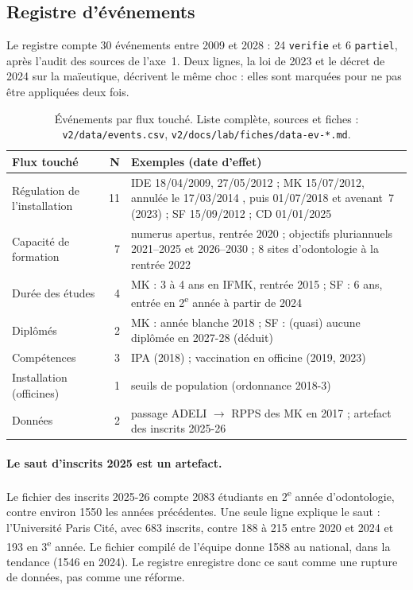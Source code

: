 \documentclass[11pt]{article}
\begin{document}
\subsection{Registre d'événements}\label{sec:res-evenements}
Le registre compte 30 événements entre 2009 et 2028\mesure{} : 24 \texttt{verifie} et 6 \texttt{partiel}, après
l'audit des sources de l'axe~1. Deux lignes, la loi de 2023 et le décret de 2024 sur la maïeutique, décrivent le
même choc : elles sont marquées pour ne pas être appliquées deux fois.
\begin{table}[h]
\centering\small
\begin{tabular}{@{}lrp{10.5cm}@{}}
\toprule
Flux touché & N & Exemples (date d'effet) \\
\midrule
Régulation de l'installation & 11 & IDE 18/04/2009, 27/05/2012 \citep{ameliIde} ; MK 15/07/2012, annulée le 17/03/2014 \citep{ce2014mk}, puis 01/07/2018 et avenant~7 (2023) \citep{ameliMk} ; SF 15/09/2012 \citep{ameliSf} ; CD 01/01/2025 \citep{arspaca2025cd} \\
Capacité de formation & 7 & numerus apertus, rentrée 2020 \citep{loiotss2019} ; objectifs pluriannuels 2021--2025 et 2026--2030 ; 8 sites d'odontologie à la rentrée 2022 \\
Durée des études & 4 & MK : 3 à 4 ans en IFMK, rentrée 2015 \citep{arretemk2015} ; SF : 6 ans, entrée en 2\textsuperscript{e} année à partir de 2024 \\
Diplômés & 2 & MK : année blanche 2018 \citep{drees2020er1159} ; SF : (quasi) aucune diplômée en 2027-28 (déduit) \\
Compétences & 3 & IPA (2018) ; vaccination en officine (2019, 2023) \\
Installation (officines) & 1 & seuils de population (ordonnance 2018-3) \\
Données & 2 & passage ADELI $\rightarrow$ RPPS des MK en 2017 \citep{drees2020er1159} ; artefact des inscrits 2025-26 \\
\bottomrule
\end{tabular}
\caption{Événements par flux touché. Liste complète, sources et fiches : \texttt{v2/data/events.csv},
\texttt{v2/docs/lab/fiches/data-ev-*.md}.}
\label{tab:evenements}
\end{table}

\paragraph{Le saut d'inscrits 2025 est un artefact.} Le fichier des inscrits 2025-26 compte \num{2083} étudiants
en 2\textsuperscript{e} année d'odontologie\mesure{}, contre environ \num{1550} les années précédentes. Une seule
ligne explique le saut : l'Université Paris Cité, avec 683 inscrits\mesure{}, contre 188 à 215 entre 2020 et 2024
et 193 en 3\textsuperscript{e} année. Le fichier compilé de l'équipe donne \num{1588} au national, dans la tendance
(\num{1546} en 2024). Le registre enregistre donc ce saut comme une rupture de données, pas comme une réforme.
\end{document}
